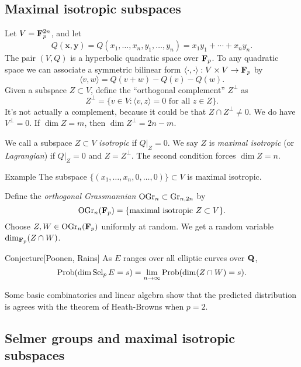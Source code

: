 \subsection{Maximal isotropic subspaces}

Let $V=\mathbf{F}_p^{2n}$, and let 
\[
  Q(\boldsymbol x,\boldsymbol y) = Q(x_1,\dots,x_n,y_1,\dots,y_n) = x_1 y_1 + \cdots + x_n y_n .
\]
The pair $(V,Q)$ is a hyperbolic quadratic space over $\mathbf{F}_p$. To any quadratic 
space we can associate a symmetric bilinear form 
$\langle \cdot,\cdot\rangle:V\times V\to \mathbf{F}_p$ by 
\[
  \langle v,w\rangle = Q(v+w)-Q(v)-Q(w) .
\]
Given a subspace $Z\subset V$, define the ``orthogonal complement'' $Z^\bot$ as 
\[
  Z^\bot = \{v\in V:\langle v,z\rangle = 0\text{ for all }z\in Z\} .
\]
It's not actually a complement, because it could be that $Z\cap Z^\bot \ne 0$. 
We do have $V^\bot = 0$. If $\dim Z=m$, then $\dim Z^\bot = 2 n-m$. 

We call a subspace $Z\subset V$ \emph{isotropic} if $Q|_Z=0$. We say $Z$ is 
\emph{maximal isotropic} (or \emph{Lagrangian}) if $Q|_Z=0$ and $Z=Z^\bot$. The 
second condition forces $\dim Z=n$. 

\begin{enonce}[remark]{Example}
The subspace $\{(x_1,\dots,x_n,0,\dots,0)\}\subset V$ is maximal isotropic. 
\end{enonce}

Define the \emph{orthogonal Grassmannian} 
$\operatorname{OGr}_n\subset \operatorname{Gr}_{n,2 n}$ by 
\[
  \operatorname{OGr}_n(\mathbf{F}_p) = \{\text{maximal isotropic }Z\subset V\} .
\]
Choose $Z,W\in \operatorname{OGr}_n(\mathbf{F}_p)$ uniformly at random. We get 
a random variable $\dim_{\mathbf{F}_p}(Z\cap W)$. 

\begin{enonce}{Conjecture}[Poonen, Rains]
As $E$ ranges over all elliptic curves over $\mathbf{Q}$, 
\[
  \operatorname{Prob}(\dim \operatorname{Sel}_p E=s) = \lim_{n\to \infty} \operatorname{Prob}(\dim(Z\cap W)=s) .
\]
\end{enonce}

Some basic combinatorics and linear algebra show that the predicted 
distribution is agrees with the theorem of Heath-Browns when $p=2$. 





\subsection{Selmer groups and maximal isotropic subspaces}

